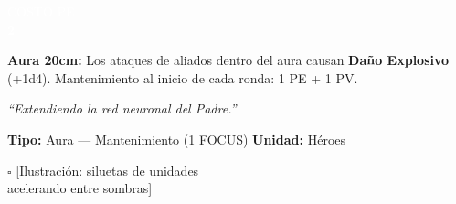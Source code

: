 \begin{center}
\begin{tcbitemize}
    \vfill

    \noindent
    \begin{minipage}[b]{0.22\linewidth}
        \begin{tcolorbox}[colback=BloodPurple, colframe=VoidBlack, sharp corners,
                          halign=center, valign=center, boxsep=0pt,
                          left=0pt, right=0pt, top=0pt, bottom=0pt,
                          nobeforeafter, height=1.9cm]
            \textcolor{white}{\fontsize{5.5}{6}\selectfont COSTO PE\\[3pt] \Large \textbf{2}}
        \end{tcolorbox}
    \end{minipage}%
    \hfill
    \begin{minipage}[b]{0.75\linewidth}
        \begin{tcolorbox}[colback=white, colframe=VoidPurple, sharp corners, boxrule=0.5pt,
                          left=2pt, right=2pt, top=2pt, bottom=2pt,
                          nobeforeafter, height=1.4cm]
            \fontsize{6}{7}\selectfont
            \textbf{Aura 20cm:} Los ataques de aliados dentro del aura causan \textbf{Daño Explosivo} (+1d4). Mantenimiento al inicio de cada ronda: 1 PE + 1 PV.
        \end{tcolorbox}
        \vspace{2pt}
        \begin{center}
            \fontsize{5.5}{6}\selectfont \itshape
            \textcolor{VoidPurple}{``Extendiendo la red neuronal del Padre.''}
        \end{center}
    \end{minipage}


\tcbitem[title={\textbf{MANTO OSCURO} \hfill \textcolor{white}{\small Aura}}]

    {\fontsize{6.5}{7}\selectfont
    \textbf{Tipo:} Aura — Mantenimiento (1 FOCUS) \hfill \textbf{Unidad:} Héroes}
    \vspace{2pt}

    \begin{tcolorbox}[colback=ChromeGray!15, colframe=ChromeGray!40, height=2.5cm,
                      halign=center, valign=center, sharp corners, size=small, nobeforeafter]
        \textcolor{ChromeGray}{\fontsize{7}{8}\selectfont $\square$ [Ilustración: siluetas de unidades\\ acelerando entre sombras]}
    \end{tcolorbox}


\end{tcbitemize}
\end{center}
